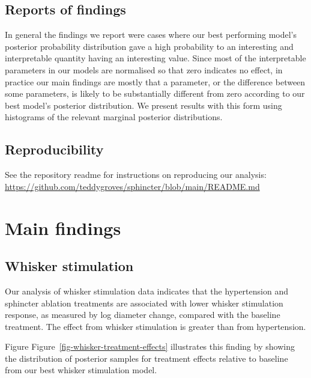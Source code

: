 \documentclass[
  letterpaper,
  DIV=11,
  numbers=noendperiod,
  oneside]{scrartcl}
\theoremstyle{plain}
\theoremstyle{remark}
\begin{document}
\subsection{Reports of findings}\label{reports-of-findings}

In general the findings we report were cases where our best performing
model's posterior probability distribution gave a high probability to an
interesting and interpretable quantity having an interesting value.
Since most of the interpretable parameters in our models are normalised
so that zero indicates no effect, in practice our main findings are
mostly that a parameter, or the difference between some parameters, is
likely to be substantially different from zero according to our best
model's posterior distribution. We present results with this form using
histograms of the relevant marginal posterior distributions.

\subsection{Reproducibility}\label{reproducibility}

See the repository readme for instructions on reproducing our analysis:
\url{https://github.com/teddygroves/sphincter/blob/main/README.md}

\section{Main findings}\label{main-findings}

\subsection{Whisker stimulation}\label{whisker-stimulation}

Our analysis of whisker stimulation data indicates that the hypertension
and sphincter ablation treatments are associated with lower whisker
stimulation response, as measured by log diameter change, compared with
the baseline treatment. The effect from whisker stimulation is greater
than from hypertension.

Figure Figure~\ref{fig-whisker-treatment-effects} illustrates this
finding by showing the distribution of posterior samples for treatment
effects relative to baseline from our best whisker stimulation model.
\end{document}
